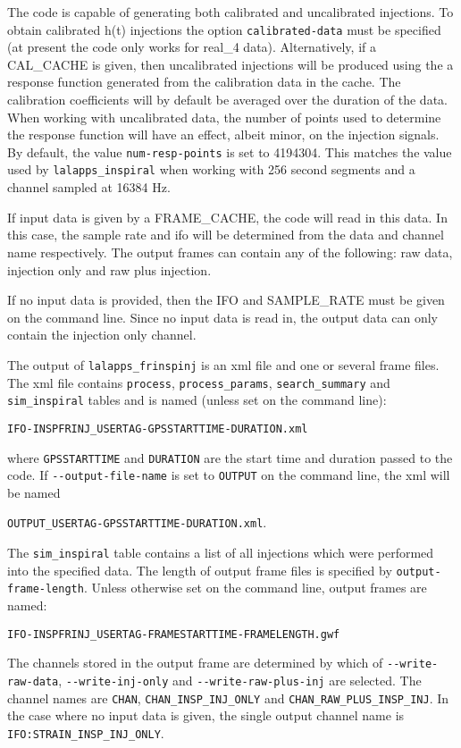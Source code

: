 \begin{entry}
The code is capable of generating both calibrated and uncalibrated
injections.  To obtain calibrated h(t) injections the option
\texttt{calibrated-data} must be specified (at present the code only
works for real\_4 data).  Alternatively, if a \textsc{CAL\_CACHE} is
given, then uncalibrated injections will be produced using the a
response function generated from the calibration data in the cache.  The
calibration coefficients will by default be averaged over the duration
of the data.  When working with uncalibrated data, the number of points
used to determine the response function will have an effect, albeit
minor, on the injection signals.  By default, the value
\texttt{num-resp-points} is set to 4194304.  This matches the value used
by \texttt{lalapps\_inspiral} when working with 256 second segments and
a channel sampled at 16384 Hz.

If input data is given by a \textsc{FRAME\_CACHE}, the code will read in
this data.  In this case, the sample rate and ifo will be determined
from the data and channel name respectively.  The output frames can
contain any of the following: raw data, injection only and raw plus
injection.  

If no input data is provided, then the \textsc{IFO} and
\textsc{SAMPLE\_RATE} must be given on the command line.  Since no input
data is read in, the output data can only contain the injection only
channel.

The output of \verb$lalapps_frinspinj$ is an xml file and one or several
frame files.  The xml file contains
\verb$process$, \verb$process_params$, \verb$search_summary$ and
\verb$sim_inspiral$ tables and is named (unless set on the command line):
\begin{center}
\texttt{IFO-INSPFRINJ\_USERTAG-GPSSTARTTIME-DURATION.xml}\\
\end{center}
where \texttt{GPSSTARTTIME} and \texttt{DURATION} are the start time and
duration passed to the code.  If \verb$--output-file-name$ is set to
\verb$OUTPUT$ on the command line, the xml will be named
\begin{center}
\texttt{OUTPUT\_USERTAG-GPSSTARTTIME-DURATION.xml}.\\
\end{center}
The \verb$sim_inspiral$ table contains a list of all injections which
were performed into the specified data.  The length of output frame
files is specified by \verb$output-frame-length$.  Unless otherwise set
on the command line, output frames are named: 
\begin{center}
\texttt{IFO-INSPFRINJ\_USERTAG-FRAMESTARTTIME-FRAMELENGTH.gwf}\\
\end{center}
The channels stored in the output frame are determined by which of
\verb$--write-raw-data$, \verb$--write-inj-only$ and
\verb$--write-raw-plus-inj$ are selected.  The channel names are
\verb$CHAN$, \verb$CHAN_INSP_INJ_ONLY$ and
\verb$CHAN_RAW_PLUS_INSP_INJ$.  In the case where no input data is
given, the single output channel name is \verb$IFO:STRAIN_INSP_INJ_ONLY$.


\end{entry}
